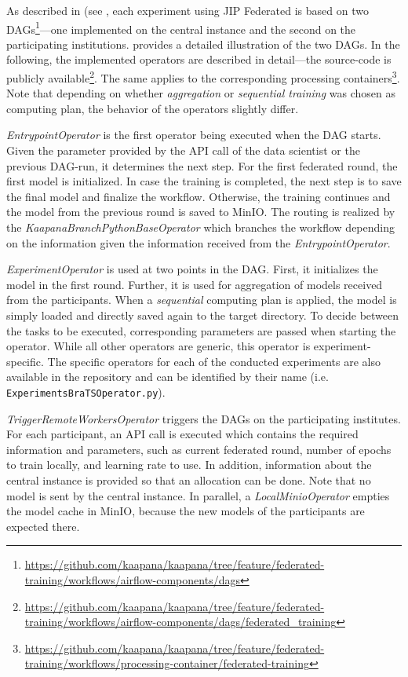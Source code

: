 As described in  (see \pageref{subsec:MethodsJIPFederated}, each experiment using JIP Federated is based on two DAGs\footnote{\url{https://github.com/kaapana/kaapana/tree/feature/federated-training/workflows/airflow-components/dags}}---one implemented on the central instance and the second on the participating institutions.  provides a detailed illustration of the two DAGs.
In the following, the implemented operators are described in detail---the source-code is publicly available\footnote{\url{https://github.com/kaapana/kaapana/tree/feature/federated-training/workflows/airflow-components/dags/federated_training}}.
The same applies to the corresponding processing containers\footnote{\url{https://github.com/kaapana/kaapana/tree/feature/federated-training/workflows/processing-container/federated-training}}.
Note that depending on whether \textit{aggregation} or \textit{sequential training} was chosen as computing plan, the behavior of the operators slightly differ.

\textit{EntrypointOperator} is the first operator being executed when the DAG starts. Given the parameter provided by the API call of the data scientist or the previous DAG-run, it determines the next step. 
For the first federated round, the first model is initialized. In case the training is completed, the next step is to save the final model and finalize the workflow.
Otherwise, the training continues and the model from the previous round is saved to MinIO.
The routing is realized by the \textit{KaapanaBranchPythonBaseOperator} which branches the workflow depending on the information given the information received from the \textit{EntrypointOperator}.

\textit{ExperimentOperator} is used at two points in the DAG. First, it initializes the model in the first round. Further, it is used for aggregation of models received from the participants. When a \textit{sequential} computing plan is applied, the model is simply loaded and directly saved again to the target directory.
To decide between the tasks to be executed, corresponding parameters are passed when starting the operator.
While all other operators are generic, this operator is experiment-specific. The specific operators for each of the conducted experiments are also available in the repository and can be identified by their name (i.e. \verb|ExperimentsBraTSOperator.py|).

\textit{TriggerRemoteWorkersOperator} triggers the DAGs on the participating institutes. For each participant, an API call is executed which contains the required information and parameters, such as current federated round, number of epochs to train locally, and learning rate to use. In addition, information about the central instance is provided so that an allocation can be done. Note that no model is sent by the central instance.
In parallel, a \textit{LocalMinioOperator} empties the model cache in MinIO, because the new models of the participants are expected there.

